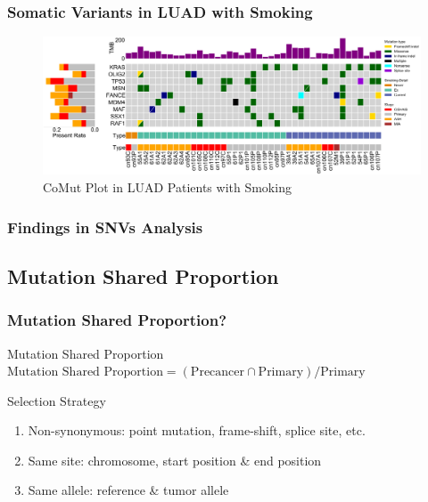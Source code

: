 \documentclass{beamer}
\begin{document}
    \begin{frame}
        \frametitle{Somatic Variants in LUAD with Smoking}

        \begin{figure}
            \includegraphics[width=\linewidth]{figures/Mutect2/BWA-ADC.Smoking.pdf}
            \caption{CoMut Plot in LUAD Patients with Smoking}
        \end{figure}
    \end{frame}

    \begin{frame}
        \frametitle{Findings in SNVs Analysis}
    \end{frame}

    \subsection{Mutation Shared Proportion}
    \begin{frame}
        \frametitle{Mutation Shared Proportion?}

        \begin{block}{Mutation Shared Proportion}
            $\textrm{Mutation Shared Proportion} = (\textrm{Precancer} \cap \textrm{Primary}) / \textrm{Primary}$
        \end{block}

        \begin{block}{Selection Strategy}
            \begin{enumerate}
                \item Non-synonymous: point mutation, frame-shift, splice site, etc.
                \item Same site: chromosome, start position \& end position
                \item Same allele: reference \& tumor allele
            \end{enumerate}
        \end{block}
    \end{frame}
\end{document}
